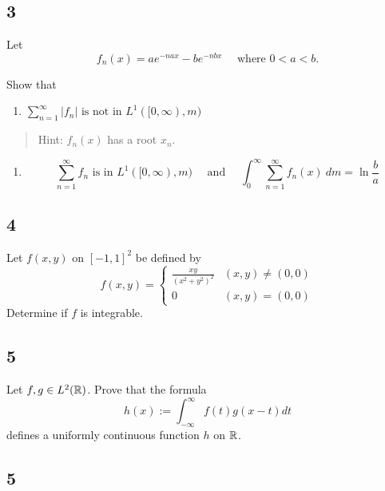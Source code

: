 \hypertarget{section-2}{%
\subsection{3}\label{section-2}}

Let \[
f_{n}(x)=a e^{-n a x}-b e^{-n b x} \quad \text{ where } 0 < a < b.
\]

Show that

\begin{enumerate}
\def\labelenumi{\alph{enumi}.}
\tightlist
\item
  \(\sum_{n=1}^{\infty}\left|f_{n}\right| \text { is not in } L^{1}([0, \infty), m)\)
\end{enumerate}

\begin{quote}
Hint: \(f_n(x)\) has a root \(x_n\).
\end{quote}

\begin{enumerate}
\def\labelenumi{\alph{enumi}.}
\setcounter{enumi}{1}
\tightlist
\item
  \[
  \sum_{n=1}^{\infty} f_{n} \text { is in } L^{1}([0, \infty), m) 
  \quad \text { and } \quad 
  \int_{0}^{\infty} \sum_{n=1}^{\infty} f_{n}(x) ~d m=\ln \frac{b}{a}
  \]
\end{enumerate}

\hypertarget{section-3}{%
\subsection{4}\label{section-3}}

Let \(f(x, y)\) on \([-1, 1]^2\) be defined by \[
f(x, y) = \begin{cases}
\frac{x y}{\left(x^{2}+y^{2}\right)^{2}} & (x, y) \neq (0, 0) \\
0 & (x, y) = (0, 0)
\end{cases}
\] Determine if \(f\) is integrable.

\hypertarget{section-4}{%
\subsection{5}\label{section-4}}

Let \(f, g \in L^2({\mathbb{R}})\). Prove that the formula \[
h(x):=\int_{-\infty}^{\infty} f(t) g(x-t) d t
\] defines a uniformly continuous function \(h\) on \({\mathbb{R}}\).

\hypertarget{section-5}{%
\subsection{5}\label{section-5}}

